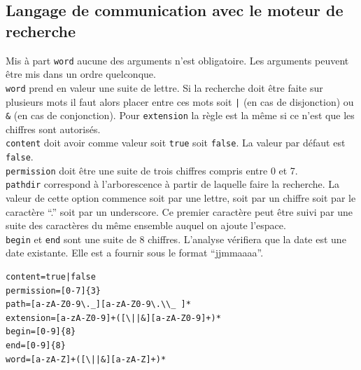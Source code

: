 \subsection{Langage de communication avec le moteur de recherche}\label{langage_req}
Mis à part \verb"word" aucune des arguments n'est obligatoire. Les arguments peuvent être mis dans un ordre quelconque.\\
\verb"word" prend en valeur une suite de lettre. Si la recherche doit être faite sur plusieurs mots il faut alors placer entre ces mots soit \verb"|" (en cas de disjonction) ou \verb"&" (en cas de conjonction). Pour \verb"extension" la règle est la m\^{e}me si ce n'est que les chiffres sont autorisés.\\
\verb"content" doit avoir comme valeur soit \verb"true" soit \verb"false". La valeur par défaut est \verb"false".\\
\verb"permission" doit \^{e}tre une suite de trois chiffres compris entre 0 et 7.\\
\verb"pathdir" correspond à l'arborescence à partir de laquelle faire la recherche. La valeur de cette option commence soit par une lettre, soit par un chiffre soit par le caractère \enquote{.} soit par un underscore. Ce premier caractère peut être suivi par une suite des caractères du même ensemble auquel on ajoute l'espace.\\
\verb"begin" et \verb"end" sont une suite de 8 chiffres. L'analyse vérifiera que la date est une date existante. Elle est a fournir sous le format \enquote{jjmmaaaa}. 
\begin{lstlisting}[frame=single]
content=true|false
permission=[0-7]{3}
path=[a-zA-Z0-9\._][a-zA-Z0-9\.\\_ ]*
extension=[a-zA-Z0-9]+([\||&][a-zA-Z0-9]+)*
begin=[0-9]{8}
end=[0-9]{8}
word=[a-zA-Z]+([\||&][a-zA-Z]+)*
\end{lstlisting}

\newpage

